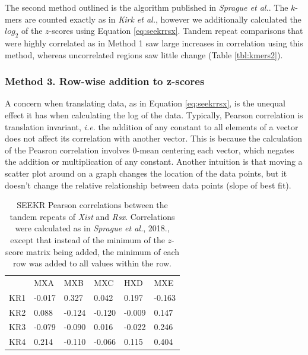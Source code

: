 The second method outlined is the algorithm published in \emph{Sprague et al.}. The $k$-mers are counted exactly as in \emph{Kirk et al.}, however we additionally calculated the $log_2$ of the $z$-scores using Equation \ref{eq:seekrrsx}. Tandem repeat comparisons that were highly correlated as in Method 1 saw large increases in correlation using this method, whereas uncorrelated regions saw little change (Table \ref{tbl:kmers2}). 




\subsubsection{Method 3. Row-wise addition to z-scores}

A concern when translating data, as in Equation \ref{eq:seekrrsx}, is the unequal effect it has when calculating the log of the data. Typically, Pearson correlation is translation invariant, \emph{i.e.} the addition of any constant to all elements of a vector does not affect its correlation with another vector. This is because the calculation of the Peasron correlation involves 0-mean centering each vector, which negates the addition or multiplication of any constant. Another intuition is that moving a scatter plot around on a graph changes the location of the data points, but it doesn't change the relative relationship between data points (slope of best fit). 

\begin{table}[ht]
\begin{center}
\begin{tabular}{llllll}
&MXA & MXB                   & MXC                  & HXD                  & MXE                                  \\
KR1 & -0.017 & 0.327   & 0.042  & 0.197    & -0.163 \\
KR2 & 0.088   & -0.124 & -0.120 & -0.009 & 0.147 \\
KR3 & -0.079  & -0.090 & 0.016 & -0.022 & 0.246 \\
KR4 & 0.214    & -0.110 & -0.066  & 0.115   & 0.404
\end{tabular}
\caption{SEEKR Pearson correlations between the tandem repeats of \emph{Xist} and \emph{Rsx}. Correlations were calculated as in \emph{Sprague et al.}, 2018., except that instead of the minimum of the $z$-score matrix being added, the minimum of each row was added to all values within the row.}
\label{tbl:kmers3}
\end{center}
\end{table}


